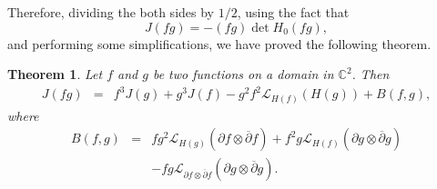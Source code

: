 \documentclass[12pt]{amsart}
\newtheorem{theorem}{Theorem}[section]
\def\d{\partial}
\def\dbar{\overline{\partial}}
\def\d{\partial}
\def\cal{\mathcal}
\begin{document}
Therefore,
dividing the both sides by $1/2$, using the fact that
$$
J(fg)=-(fg) \det H_0(fg),
$$
and performing some simplifications, we have proved the following theorem.
\begin{theorem}\label{1.1} Let $f$ and $g$ be two functions on a domain in $\mathbb{C}^2$. Then
\begin{eqnarray}\label{1}
J(fg)
&=& f^3 J(g) +g^3 J(f) 
-g^2f^2 {\cal L}_{H(f)}(H(g))+B(f, g),
\end{eqnarray}
where
\begin{eqnarray}
B(f, g)&=&fg^2 {\cal L}_{H(g)}(\d f\otimes \dbar f)+f^2 g  {\cal L}_{H(f)}(\d g\otimes \dbar g) \nonumber\\
&&-fg {\cal L}_{\d f\otimes \dbar f}(\d g\otimes \dbar g).
\end{eqnarray}
\end{theorem}
\end{document}
